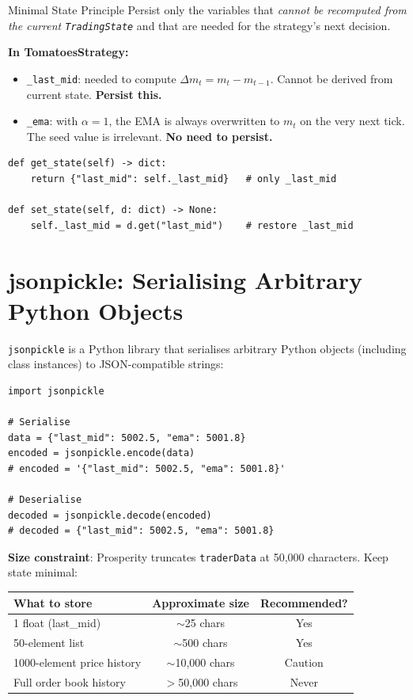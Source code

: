 \documentclass[12pt,a4paper,openany]{report}
\theoremstyle{definition}
\begin{document}
\begin{keyconceptbox}{Minimal State Principle}
Persist only the variables that \emph{cannot be recomputed from the current \texttt{TradingState}} and that are needed for the strategy's next decision.

\textbf{In TomatoesStrategy:}
\begin{itemize}
  \item \texttt{\_last\_mid}: needed to compute $\Delta m_t = m_t - m_{t-1}$. Cannot be derived from current state. \textbf{Persist this.}
  \item \texttt{\_ema}: with $\alpha = 1$, the EMA is always overwritten to $m_t$ on the very next tick. The seed value is irrelevant. \textbf{No need to persist.}
\end{itemize}
\end{keyconceptbox}

\begin{lstlisting}[caption={Minimal state in TomatoesStrategy}]
def get_state(self) -> dict:
    return {"last_mid": self._last_mid}   # only _last_mid

def set_state(self, d: dict) -> None:
    self._last_mid = d.get("last_mid")    # restore _last_mid
\end{lstlisting}

\section{jsonpickle: Serialising Arbitrary Python Objects}

\texttt{jsonpickle} is a Python library that serialises arbitrary Python objects (including class instances) to JSON-compatible strings:

\begin{lstlisting}[caption={jsonpickle basics}]
import jsonpickle

# Serialise
data = {"last_mid": 5002.5, "ema": 5001.8}
encoded = jsonpickle.encode(data)
# encoded = '{"last_mid": 5002.5, "ema": 5001.8}'

# Deserialise
decoded = jsonpickle.decode(encoded)
# decoded = {"last_mid": 5002.5, "ema": 5001.8}
\end{lstlisting}

\textbf{Size constraint}: Prosperity truncates \texttt{traderData} at 50{,}000 characters. Keep state minimal:
\begin{center}
\begin{tabular}{lcc}
\toprule
\textbf{What to store} & \textbf{Approximate size} & \textbf{Recommended?} \\
\midrule
1 float (last\_mid) & $\sim$25 chars & Yes \\
50-element list & $\sim$500 chars & Yes \\
1000-element price history & $\sim$10{,}000 chars & Caution \\
Full order book history & $>$50{,}000 chars & Never \\
\bottomrule
\end{tabular}
\end{center}
\end{document}
